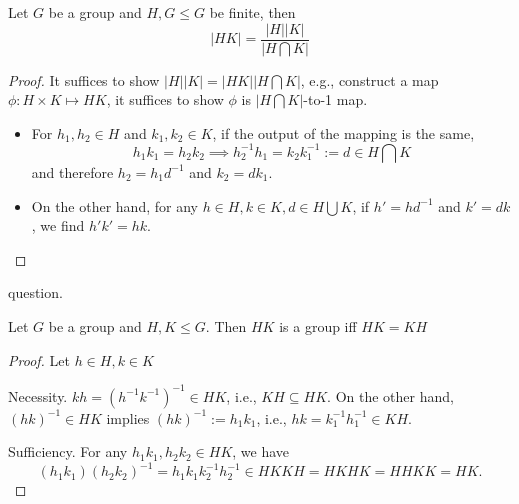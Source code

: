 \begin{theorem}
Let $G$ be a group and $H,G\le G$ be finite, then
\[
|HK| = \frac{|H||K|}{|H\bigcap K|}
\]
\end{theorem}
\begin{proof}
It suffices to show $|H||K| = |HK||H\bigcap K|$, e.g., construct a map $\phi: H\times K\mapsto HK$, it suffices to show $\phi$ is $|H\bigcap K|$-to-1 map. 
\begin{itemize}
\item
For $h_1,h_2\in H$ and $k_1,k_2\in K$, if the output of the mapping is the same, 
\[
h_1k_1=h_2k_2\implies
h_2^{-1}h_1=k_2k_1^{-1}:=d\in H\bigcap K
\]
and therefore $h_2 = h_1d^{-1}$ and $k_2 = dk_1$.
\item
On the other hand, for any $h\in H,k\in K,d\in H\bigcup K$, if $h'=hd^{-1}$ and $k'=dk$, we find $h'k'=hk$.
\end{itemize}
\end{proof}
question.
\begin{theorem}
Let $G$ be a group and $H,K\le G$. Then $HK$ is a group iff $HK = KH$
\end{theorem}
\begin{proof}
Let $h\in H,k\in K$

Necessity. $kh=(h^{-1}k^{-1})^{-1}\in HK$, i.e., $KH\subseteq HK$. On the other hand, $(hk)^{-1}\in HK$ implies $(hk)^{-1}:=h_1k_1$, i.e., $hk=k_1^{-1}h_1^{-1}\in KH$.

Sufficiency. For any $h_1k_1,h_2k_2\in HK$, we have
\[
(h_1k_1)(h_2k_2)^{-1}=h_1k_1k_2^{-1}h_2^{-1}
\in HKKH=HKHK=HHKK=HK.
\]
\end{proof}













